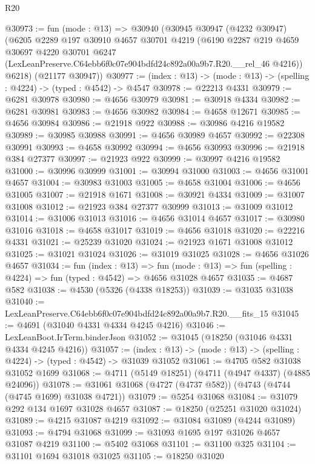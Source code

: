 \begin{lexlean}{R20}
\begin{coremodule}
@30973 := fun (mode : @13) =>
  @30940
    (@30945
      @30947
      (@4232 @30947)
      (@6205
        @2289
        @197
        @30910
        @4657
        @30701
        @4219
        (@6190
          @2287
          @219
          @4659
          @30697
          @4220
          @30701
          @6247
          (LexLeanPreserve.C64ebb6f0c07e904bdfd24c892a00a9b7.R20.__rel_46 @4216))
        @6218)
      (@21177 @30947))
@30977 := (index : @13) -> (mode : @13) -> (spelling : @4224) -> (typed : @4542) -> @4547
@30978 := @22213 @4331
@30979 := @6281 @30978
@30980 := @4656 @30979
@30981 := @30918 @4334
@30982 := @6281 @30981
@30983 := @4656 @30982
@30984 := @4658 @12671
@30985 := @4656 @30984
@30986 := @21918 @922
@30988 := @30986 @4216 @19582
@30989 := @30985 @30988
@30991 := @4656 @30989 @4657
@30992 := @22308 @30991
@30993 := @4658 @30992
@30994 := @4656 @30993
@30996 := @21918 @384 @27377
@30997 := @21923 @922
@30999 := @30997 @4216 @19582
@31000 := @30996 @30999
@31001 := @30994 @31000
@31003 := @4656 @31001 @4657
@31004 := @30983 @31003
@31005 := @4658 @31004
@31006 := @4656 @31005
@31007 := @21918 @1671
@31008 := @30921 @4334
@31009 := @31007 @31008
@31012 := @21923 @384 @27377 @30999
@31013 := @31009 @31012
@31014 := @31006 @31013
@31016 := @4656 @31014 @4657
@31017 := @30980 @31016
@31018 := @4658 @31017
@31019 := @4656 @31018
@31020 := @22216 @4331
@31021 := @25239 @31020
@31024 := @21923 @1671 @31008 @31012
@31025 := @31021 @31024
@31026 := @31019 @31025
@31028 := @4656 @31026 @4657
@31034 := fun (index : @13) =>
  fun (mode : @13) => fun (spelling : @4224) => fun (typed : @4542) => @4656 @31028 @4657
@31035 := @4687 @582
@31038 := @4530 (@5326 (@4338 @18253))
@31039 := @31035 @31038
@31040 := LexLeanPreserve.C64ebb6f0c07e904bdfd24c892a00a9b7.R20.__fits_15
@31045 := @4691 (@31040 @4331 @4334 @4245 @4216)
@31046 := LexLeanBoot.IrTerm.binderJson
@31052 := @31045 (@18250 (@31046 @4331 @4334 @4245 @4216))
@31057 := (index : @13) -> (mode : @13) -> (spelling : @4224) -> (typed : @4542) -> @31039 @31052
@31061 := @4705 @582 @31038 @31052 @1699
@31068 := @4711 (@5149 @18251) (@4711 (@4947 @4337) (@4885 @24096))
@31078 := @31061 @31068 (@4727 (@4737 @582)) (@4743 (@4744 (@4745 @1699) @31038 @4721))
@31079 := @5254 @31068
@31084 := @31079 @292 @134 @1697 @31028 @4657
@31087 := @18250 (@25251 @31020 @31024)
@31089 := @4215 @31087 @4219
@31092 := @31084 @31089 (@4244 @31089)
@31093 := @4794 @31068
@31099 := @31093 @1695 @197 @31026 @4657 @31087 @4219
@31100 := @5402 @31068
@31101 := @31100 @325
@31104 := @31101 @1694 @31018 @31025
@31105 := @18250 @31020

\end{coremodule}
\end{lexlean}
